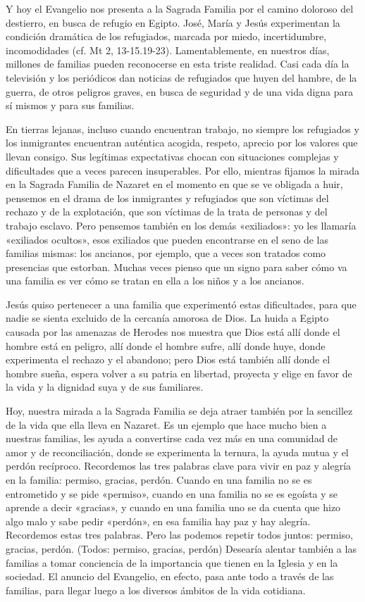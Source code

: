 \documentclass[]{article}
\begin{document}
Y hoy el Evangelio nos presenta a la Sagrada Familia por el camino
doloroso del destierro, en busca de refugio en Egipto. José, María y
Jesús experimentan la condición dramática de los refugiados, marcada por
miedo, incertidumbre, incomodidades (cf. Mt 2, 13-15.19-23).
Lamentablemente, en nuestros días, millones de familias pueden
reconocerse en esta triste realidad. Casi cada día la televisión y los
periódicos dan noticias de refugiados que huyen del hambre, de la
guerra, de otros peligros graves, en busca de seguridad y de una vida
digna para sí mismos y para sus familias.

En tierras lejanas, incluso cuando encuentran trabajo, no siempre los
refugiados y los inmigrantes encuentran auténtica acogida, respeto,
aprecio por los valores que llevan consigo. Sus legítimas expectativas
chocan con situaciones complejas y dificultades que a veces parecen
insuperables. Por ello, mientras fijamos la mirada en la Sagrada Familia
de Nazaret en el momento en que se ve obligada a huir, pensemos en el
drama de los inmigrantes y refugiados que son víctimas del rechazo y de
la explotación, que son víctimas de la trata de personas y del trabajo
esclavo. Pero pensemos también en los demás «exiliados»: yo les llamaría
«exiliados ocultos», esos exiliados que pueden encontrarse en el seno de
las familias mismas: los ancianos, por ejemplo, que a veces son tratados
como presencias que estorban. Muchas veces pienso que un signo para
saber cómo va una familia es ver cómo se tratan en ella a los niños y a
los ancianos.

Jesús quiso pertenecer a una familia que experimentó estas dificultades,
para que nadie se sienta excluido de la cercanía amorosa de Dios. La
huida a Egipto causada por las amenazas de Herodes nos muestra que Dios
está allí donde el hombre está en peligro, allí donde el hombre sufre,
allí donde huye, donde experimenta el rechazo y el abandono; pero Dios
está también allí donde el hombre sueña, espera volver a su patria en
libertad, proyecta y elige en favor de la vida y la dignidad suya y de
sus familiares.

Hoy, nuestra mirada a la Sagrada Familia se deja atraer también por la
sencillez de la vida que ella lleva en Nazaret. Es un ejemplo que hace
mucho bien a nuestras familias, les ayuda a convertirse cada vez más en
una comunidad de amor y de reconciliación, donde se experimenta la
ternura, la ayuda mutua y el perdón recíproco. Recordemos las tres
palabras clave para vivir en paz y alegría en la familia: permiso,
gracias, perdón. Cuando en una familia no se es entrometido y se pide
«permiso», cuando en una familia no se es egoísta y se aprende a decir
«gracias», y cuando en una familia uno se da cuenta que hizo algo malo y
sabe pedir «perdón», en esa familia hay paz y hay alegría. Recordemos
estas tres palabras. Pero las podemos repetir todos juntos: permiso,
gracias, perdón. (Todos: permiso, gracias, perdón) Desearía alentar
también a las familias a tomar conciencia de la importancia que tienen
en la Iglesia y en la sociedad. El anuncio del Evangelio, en efecto,
pasa ante todo a través de las familias, para llegar luego a los
diversos ámbitos de la vida cotidiana.
\end{document}
